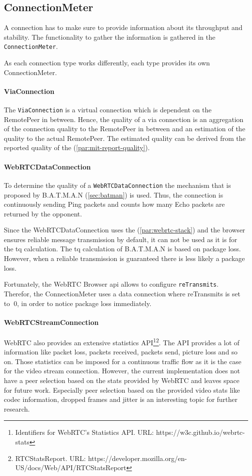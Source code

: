 \subsection{ConnectionMeter}\label{sec:mit-connectionMeter}
A connection has to make sure to provide information about its throughput and stability. The functionality to gather the information is gathered in the \lstinline|ConnectionMeter|.

As each connection type works differently, each type provides its own ConnectionMeter.

\paragraph{ViaConnection}
The \lstinline|ViaConnection| is a virtual connection which is dependent on the RemotePeer in between. Hence, the quality of a via connection is an aggregation of the connection quality to the RemotePeer in between and an estimation of the quality to the actual RemotePeer. The estimated quality can be derived from the reported quality of the \peerUpdate (\vref{par:mit-report-quality}).

\paragraph{WebRTCDataConnection} \label{par:webrtc-data-measure-quality}
To determine the quality of a \lstinline|WebRTCDataConnection| the  mechanism that is proposed by B.A.T.M.A.N (\vref{sec:batman}) is used. Thus, the connection is continuously sending Ping packets and counts how many Echo packets are returned by the opponent. 

Since the WebRTCDataConnection uses the  (\vref{par:webrtc-stack}) and the browser ensures reliable message transmission by default, it can not be used as it is for the \gls{tq} calculation. The \gls{tq} calculation of B.A.T.M.A.N is based on package loss. However, when a reliable transmission is guaranteed there is less likely a package loss.

Fortunately, the WebRTC Browser \gls{api} allows to configure \lstinline|reTransmits|. Therefor, the ConnectionMeter uses a data connection where reTransmits is set to $\ 0 $, in order to notice package loss immediately.

\paragraph{WebRTCStreamConnection}
WebRTC also provides an extensive statistics API\footnote{Identifiers for WebRTC's Statistics API. URL: {https://w3c.github.io/webrtc-stats}}\footnote{RTCStatsReport. URL: {https://developer.mozilla.org/en-US/docs/Web/API/RTCStatsReport}}. The API provides a lot of information like packet loss, packets received, packets send, picture loss and so on. Those statistics can be imposed for a continuous traffic flow as it is the case for the video stream connection. However, the current implementation does not have a peer selection based on the stats provided by WebRTC and leaves space for future work. Especially peer selection based on the provided video stats like codec information, dropped frames and jitter is an interesting topic for further research.

